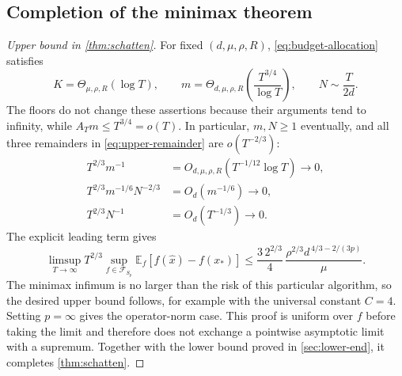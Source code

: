 \documentclass[11pt,a4paper]{article}
\newcommand{\E}{\mathbb E}
\newcommand{\FS}{\mathcal F_{S_p}}
\theoremstyle{definition}
\theoremstyle{remark}
\begin{document}
\subsection{Completion of the minimax theorem}
\label{sec:upper-completion}
\begin{proof}[Upper bound in \cref{thm:schatten}]
For fixed $(d,\mu,\rho,R)$, \eqref{eq:budget-allocation} satisfies
\begin{equation}\label{eq:allocation-asymptotics}
 K=\Theta_{\mu,\rho,R}(\log T),\qquad
 m=\Theta_{d,\mu,\rho,R}\left(\frac{T^{3/4}}{\log T}\right),\qquad
 N\sim\frac{T}{2d}.
\end{equation}
The floors do not change these assertions because their arguments tend to infinity, while $A_Tm\le T^{3/4}=o(T)$.
In particular, $m,N\ge1$ eventually, and all three remainders in \eqref{eq:upper-remainder} are $o(T^{-2/3})$:
\begin{align*}
 T^{2/3}m^{-1}&=O_{d,\mu,\rho,R}(T^{-1/12}\log T)\longrightarrow0,\\
 T^{2/3}m^{-1/6}N^{-2/3}&=O_d(m^{-1/6})\longrightarrow0,\\
 T^{2/3}N^{-1}&=O_d(T^{-1/3})\longrightarrow0.
\end{align*}
The explicit leading term gives
\begin{equation}\label{eq:upper-limit}
 \limsup_{T\to\infty}T^{2/3}\sup_{f\in\FS}
 \E_f[f(\widehat x)-f(x_*)]
 \le\frac{3\,2^{2/3}}{4}\,
 \frac{\rho^{2/3}d^{\,4/3-2/(3p)}}{\mu}.
\end{equation}
The minimax infimum is no larger than the risk of this particular algorithm, so the desired upper bound follows, for example with the universal constant $C=4$. Setting $p=\infty$ gives the operator-norm case. This proof is uniform over $f$ before taking the limit and therefore does not exchange a pointwise asymptotic limit with a supremum. Together with the lower bound proved in \cref{sec:lower-end}, it completes \cref{thm:schatten}.
\end{proof}
\end{document}
